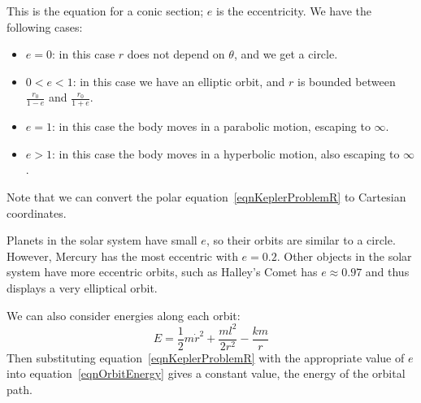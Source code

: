 \documentclass[../Main.tex]{subfiles}
\begin{document}
This is the equation for a conic section; $e$ is the eccentricity. We have the following cases:
\begin{itemize}
    \item $e = 0$: in this case $r$ does not depend on $\theta$, and we get a circle.
    \item $0 < e < 1$: in this case we have an elliptic orbit, and $r$ is bounded between $\frac{r_0}{1-e}$ and $\frac{r_0}{1+e}$.
    \item $e = 1$: in this case the body moves in a parabolic motion, escaping to $\infty$.
    \item $e > 1$: in this case the body moves in a hyperbolic motion, also escaping to $\infty$.
\end{itemize}
Note that we can convert the polar equation~\ref{eqnKeplerProblemR} to Cartesian coordinates.\par
Planets in the solar system have small $e$, so their orbits are similar to a circle. However, Mercury has the most eccentric with $e = 0.2$. Other objects in the solar system have more eccentric orbits, such as Halley's Comet has $e \approx 0.97$ and thus displays a very elliptical orbit.\par
We can also consider energies along each orbit:
\begin{equation}
    E = \frac{1}{2}m\dot{r}^2 + \frac{ml^2}{2r^2} - \frac{km}{r}
    \label{eqnOrbitEnergy}
\end{equation}
Then substituting equation~\ref{eqnKeplerProblemR} with the appropriate value of $e$ into equation~\ref{eqnOrbitEnergy} gives a constant value, the energy of the orbital path.
\end{document}
